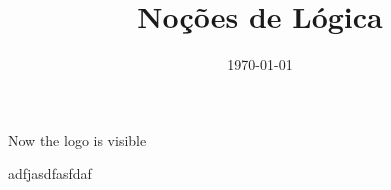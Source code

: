 \documentclass{beamer}
\title{Noções de Lógica}
\author[\autor]{\autor}
\institute[\instituto]{\instituto}
\date{\today}
\begin{document}
\begin{frame}
\maketitle
\end{frame}


\begin{frame}
Now the logo is visible
\end{frame}

\begin{frame}
    adfjasdfasfdaf
\end{frame}
\end{document}
